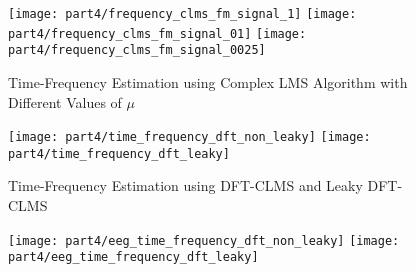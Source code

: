 \begin{figure}[H]
\centering{}
\texttt{[image: part4/frequency\_clms\_fm\_signal\_1]}
\texttt{[image: part4/frequency\_clms\_fm\_signal\_01]}
\texttt{[image: part4/frequency\_clms\_fm\_signal\_0025]}
\caption{Time-Frequency Estimation using Complex LMS Algorithm with Different Values of $\mu$}
\end{figure}

\begin{figure}[H]
\centering{}
\texttt{[image: part4/time\_frequency\_dft\_non\_leaky]}
\texttt{[image: part4/time\_frequency\_dft\_leaky]}
\caption{Time-Frequency Estimation using DFT-CLMS and Leaky DFT-CLMS}
\end{figure}

\begin{figure}[H]
\centering{}
\texttt{[image: part4/eeg\_time\_frequency\_dft\_non\_leaky]}
\texttt{[image: part4/eeg\_time\_frequency\_dft\_leaky]}
\caption{}
\end{figure}





